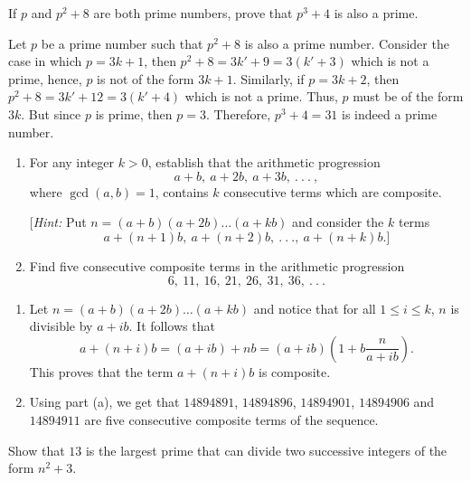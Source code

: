 \begin{exercise}
    If $p$ and $p^2 + 8$ are both prime numbers, prove that $p^3 + 4$ is also a prime. \\
\end{exercise}

\begin{solution}
    Let $p$ be a prime number such that $p^2 + 8$ is also a prime number. Consider the case in which $p = 3k+1$, then $p^2 + 8 = 3k' + 9 = 3(k' + 3)$ which is not a prime, hence, $p$ is not of the form $3k+1$. Similarly, if $p = 3k+2$, then $p^2 + 8 = 3k' + 12 = 3(k' + 4)$ which is not a prime. Thus, $p$ must be of the form $3k$. But since $p$ is prime, then $p = 3$. Therefore, $p^3 + 4 = 31$ is indeed a prime number. \\
\end{solution}

\begin{exercise}
    \begin{enumerate}
        \item For any integer $k > 0$, establish that the arithmetic progression
        $$a+b, \ a+2b, \ a+3b, \ . \ . \ . \ ,$$
        where $\gcd(a,b) = 1$, contains $k$ consecutive terms which are composite. 
        
        [\textit{Hint:} Put $n = (a+b)(a+2b)\dots (a+kb)$ and consider the $k$ terms
        $$a+(n+1)b, \ a+(n+2)b, \ . \ . \ ., \ a+(n+k)b . ] $$
        \item Find five consecutive composite terms in the arithmetic progression
        $$6, \ 11, \ 16, \ 21, \ 26, \ 31, \ 36, \ . \ . \ . $$
    \end{enumerate}
\end{exercise}

\begin{solution}
    \begin{enumerate}
        \item Let $n = (a+b)(a+2b)\dots (a+kb)$ and notice that for all $1 \leq i \leq k$, $n$ is divisible by $a+ib$. It follows that
        $$a+(n+i)b = (a+ib) + nb = (a+ib)\left(1 + b\frac{n}{a+ib}\right).$$
        This proves that the term $a+(n+i)b$ is composite.
        \item Using part (a), we get that $14894891$, $14894896$, $14894901$, $14894906$ and $14894911$ are five consecutive composite terms of the sequence.
    \end{enumerate}
\end{solution}

\begin{exercise}
    Show that $13$ is the largest prime that can divide two successive integers of the form $n^2 + 3$. \\
\end{exercise}

